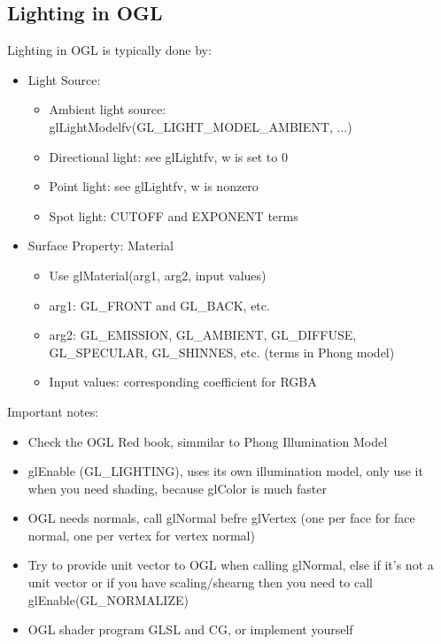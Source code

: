 \documentclass[11pt]{article}
\begin{document}
\subsection{Lighting in OGL}
Lighting in OGL is typically done by:
\begin{itemize}
    \item Light Source: \begin{itemize}
        \item Ambient light source: glLightModelfv(GL\_LIGHT\_MODEL\_AMBIENT, ...)
        \item Directional light: see glLightfv, w is set to 0
        \item Point light: see glLightfv, w is nonzero
        \item Spot light: CUTOFF and EXPONENT terms
    \end{itemize}
    \item Surface Property: Material \begin{itemize}
        \item Use glMaterial(arg1, arg2, input values)
        \item arg1: GL\_FRONT and GL\_BACK, etc.
        \item arg2: GL\_EMISSION, GL\_AMBIENT, GL\_DIFFUSE, GL\_SPECULAR, GL\_SHINNES, etc. \newline (terms in Phong model)
        \item Input values: corresponding coefficient for RGBA 
    \end{itemize}
    
\end{itemize}

Important notes: \begin{itemize}
    \item Check the OGL Red book, simmilar to Phong Illumination Model
    \item glEnable (GL\_LIGHTING), uses its own illumination model, only use it when you need shading, because glColor is much faster
    \item OGL needs normals, call glNormal befre glVertex (one per face for face normal, one per vertex for vertex normal)
    \item Try to provide unit vector to OGL when calling glNormal, else if it's not a unit vector or if you have scaling/shearng then you need to call glEnable(GL\_NORMALIZE)
    \item OGL shader program GLSL and CG, or implement yourself
\end{itemize}
\end{document}
